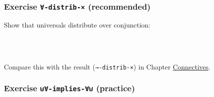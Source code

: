 \hypertarget{exercise--distrib--recommended}{%
\subsubsection{\texorpdfstring{Exercise \texttt{∀-distrib-×}
(recommended)}{Exercise ∀-distrib-× (recommended)}}\label{exercise--distrib--recommended}}

Show that universals distribute over conjunction:

\begin{fence}
\begin{code}%
\>[0]\<%
\\
\>[0][@{}l@{\AgdaIndent{0}}]%
\>[2]\AgdaSpace{}%
\AgdaSymbol{:}\AgdaSpace{}%
\AgdaSpace{}%
\AgdaSymbol{\{}\AgdaSpace{}%
\AgdaSymbol{:}\AgdaSpace{}%
\AgdaSymbol{\}}\AgdaSpace{}%
\AgdaSymbol{\{}\AgdaSpace{}%
\AgdaSpace{}%
\AgdaSymbol{:}\AgdaSpace{}%
\AgdaSpace{}%
\AgdaSpace{}%
\AgdaSymbol{\}}\AgdaSpace{}%
\<%
\\
\>[2][@{}l@{\AgdaIndent{0}}]%
\>[4]\AgdaSpace{}%
\AgdaSymbol{(}\AgdaSpace{}%
\AgdaSymbol{:}\AgdaSpace{}%
\AgdaSymbol{)}\AgdaSpace{}%
\AgdaSpace{}%
\AgdaSpace{}%
\AgdaSpace{}%
\AgdaSpace{}%
\AgdaSpace{}%
\AgdaSymbol{)}\AgdaSpace{}%
\AgdaSpace{}%
\AgdaSpace{}%
\AgdaSymbol{(}\AgdaSpace{}%
\AgdaSymbol{:}\AgdaSpace{}%
\AgdaSymbol{)}\AgdaSpace{}%
\AgdaSpace{}%
\AgdaSpace{}%
\AgdaSymbol{)}\AgdaSpace{}%
\AgdaSpace{}%
\AgdaSpace{}%
\AgdaSymbol{(}\AgdaSpace{}%
\AgdaSymbol{:}\AgdaSpace{}%
\AgdaSymbol{)}\AgdaSpace{}%
\AgdaSpace{}%
\AgdaSpace{}%
\AgdaSymbol{)}\<%
\end{code}
\end{fence}

Compare this with the result (\texttt{→-distrib-×}) in Chapter
\protect\hyperlink{Connectives}{Connectives}.

\hypertarget{exercise--implies--practice}{%
\subsubsection{\texorpdfstring{Exercise \texttt{⊎∀-implies-∀⊎}
(practice)}{Exercise ⊎∀-implies-∀⊎ (practice)}}\label{exercise--implies--practice}}

